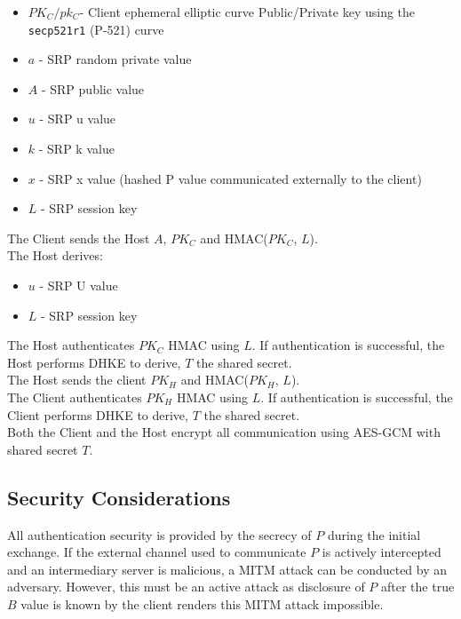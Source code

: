 \documentclass{article}
\begin{document}
    \begin{itemize}
        \item $PK_C/pk_C$- Client ephemeral elliptic curve Public/Private
        key using the \texttt{secp521r1} (P-521) curve
        \item $a$ - SRP random private value
        \item $A$ - SRP public value
        \item $u$ - SRP u value
        \item $k$ - SRP k value
        \item $x$ - SRP x value (hashed P value communicated externally to the client)
        \item $L$ - SRP session key
    \end{itemize}

    The Client sends the Host $A$, $PK_C$ and HMAC($PK_C$, $L$).\\

    The Host derives:\\

    \begin{itemize}
        \item $u$ - SRP U value
        \item $L$ - SRP session key
    \end{itemize}

    The Host authenticates $PK_C$ HMAC using $L$. If authentication is
    successful, the Host performs DHKE to derive, $T$ the shared secret.\\

    The Host sends the client $PK_H$ and HMAC($PK_H$, $L$).\\

    The Client authenticates $PK_H$ HMAC using $L$. If authentication is
    successful, the Client performs DHKE to derive, $T$ the shared secret.\\

    Both the Client and the Host encrypt all communication using AES-GCM with shared
    secret $T$.\\ %

    \subsection{Security Considerations}

    All authentication security is provided by the secrecy of $P$ during the initial
    exchange. If the external channel used to communicate $P$ is actively
    intercepted and an intermediary server is malicious, a MITM attack can be
    conducted by an adversary. However, this must be an active attack as disclosure
    of $P$ after the true $B$ value is known by the client renders this MITM attack
    impossible.\\
\end{document}
